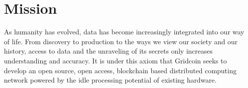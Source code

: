 \section{Mission}

\label{sec:mission}

As humanity has evolved, data has become increasingly integrated into our way of life.  From discovery to production to the ways we view our society and our history, access to data and the unraveling of its secrets only increases understanding and accuracy.  It is under this axiom that Gridcoin seeks to develop an open source, open access, blockchain based distributed computing network powered by the idle processing potential of existing hardware.
